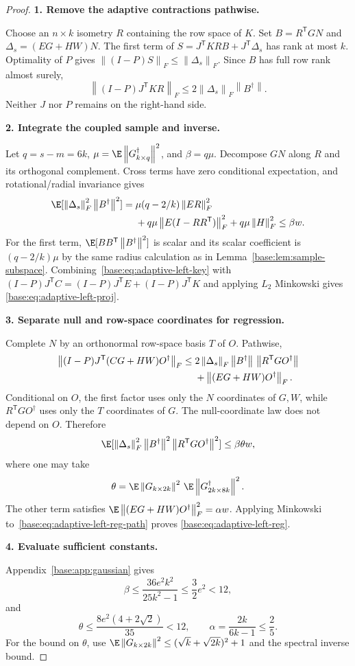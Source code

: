\documentclass[11pt,oneside,openany,a4paper]{book}
\numberwithin{equation}{chapter}
\theoremstyle{definition}
\theoremstyle{remark}
\newcommand{\proofstep}[1]{\par\addvspace{.45\baselineskip}\Needspace{3\baselineskip}\textbf{#1}\par\nobreak}
\newcommand{\T}{\mathsf T}\newcommand{\Id}{I}
\newcommand{\F}[1]{\left\lVert#1\right\rVert_F}
\newcommand{\N}[1]{\left\lVert#1\right\rVert}
\begin{document}
\begin{proof}
\proofstep{1. Remove the adaptive contractions pathwise.}
Choose an $n\times k$ isometry $R$ containing the row space of $K$.
Set $B=R^{\T}GN$ and $\Delta_s=(EG+HW)N$. The first term of
$S=J^{\T}KR B+J^{\T}\Delta_s$ has rank at most $k$.
Optimality of $P$ gives $\F{(I-P)S}\le\F{\Delta_s}$.
Since $B$ has full row rank almost surely,
\begin{equation}\label{base:eq:adaptive-left-key}
 \F{(I-P)J^{\T}KR}
 \le2\F{\Delta_s}\N{B^\dagger}.
\end{equation}
Neither $J$ nor $P$ remains on the right-hand side.

\proofstep{2. Integrate the coupled sample and inverse.}
Let $q=s-m=6k$, $\mu=\E\N{G_{k\times q}^\dagger}^2$, and $\beta=q\mu$.
Decompose $GN$ along $R$ and its orthogonal complement. Cross terms have
zero conditional expectation, and rotational/radial invariance gives
\begin{align}
 \E[\F{\Delta_s}^2\N{B^\dagger}^2]
 ={}&\mu(q-2/k)\F{ER}^2\notag\\
 &+q\mu\F{E(I-RR^{\T})}^2+q\mu\F H^2\le\beta w.
                                                        \label{base:eq:adaptive-left-mixed}
\end{align}
For the first term, $\E[BB^{\T}\N{B^\dagger}^2]$ is scalar and its scalar
coefficient is $(q-2/k)\mu$ by the same radius calculation as in
Lemma~\ref{base:lem:sample-subspace}. Combining~\eqref{base:eq:adaptive-left-key}
with $(I-P)J^{\T}C=(I-P)J^{\T}E+(I-P)J^{\T}K$ and applying $L_2$ Minkowski gives
\eqref{base:eq:adaptive-left-proj}.

\proofstep{3. Separate null and row-space coordinates for regression.}
Complete $N$ by an orthonormal row-space basis $T$ of $O$. Pathwise,
\begin{align}
 \F{(I-P)J^{\T}(CG+HW)O^\dagger}
 \le{}&2\F{\Delta_s}\N{B^\dagger}\,
                \N{R^{\T}GO^\dagger}\notag\\
 &+\F{(EG+HW)O^\dagger}.\label{base:eq:adaptive-left-reg-path}
\end{align}
Conditional on $O$, the first factor uses only the $N$ coordinates of $G,W$,
while $R^{\T}GO^\dagger$ uses only the $T$ coordinates of $G$.
The null-coordinate law does not depend on $O$. Therefore
\[
 \E[\F{\Delta_s}^2\N{B^\dagger}^2\N{R^{\T}GO^\dagger}^2]
 \le\beta\theta w,
\]
where one may take
\[
 \theta=\E\N{G_{k\times2k}}^2\,
              \E\N{G_{2k\times8k}^\dagger}^2.
\]
The other term satisfies
$\E\F{(EG+HW)O^\dagger}^2=\alpha w$.
Applying Minkowski to~\eqref{base:eq:adaptive-left-reg-path} proves
\eqref{base:eq:adaptive-left-reg}.

\proofstep{4. Evaluate sufficient constants.}
Appendix~\ref{base:app:gaussian} gives
\[
 \beta\le\frac{36e^2k^2}{25k^2-1}\le\frac32e^2<12,
\]
and
\[
 \theta\le\frac{8e^2(4+2\sqrt2)}{35}<12,
 \qquad \alpha=\frac{2k}{6k-1}\le\frac25.
\]
For the bound on $\theta$, use
$\E\N{G_{k\times2k}}^2\le(\sqrt k+\sqrt{2k})^2+1$ and the spectral
inverse bound.\end{proof}
\end{document}
